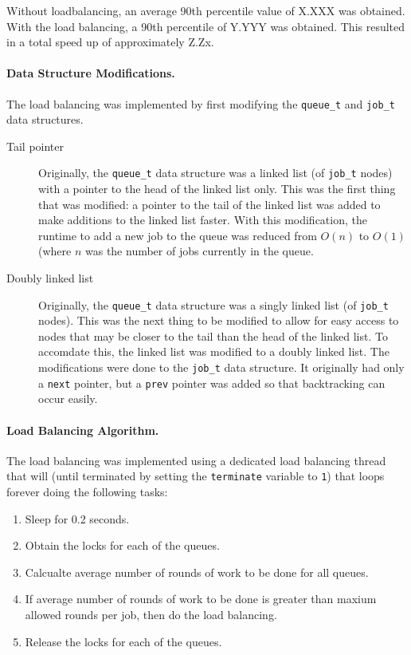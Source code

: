 \documentclass[12pt]{article}
\begin{document}
Without loadbalancing, an average 90th percentile value of X.XXX was obtained. With the load balancing, a 90th percentile of Y.YYY was obtained. This resulted in a total speed up of approximately Z.Zx.

\paragraph{Data Structure Modifications.} The load balancing was implemented by first modifying the {\tt queue_t} and {\tt job_t} data structures.
\begin{description}
  \item [Tail pointer] Originally, the {\tt queue_t} data structure was a linked list (of {\tt job_t} nodes) with a pointer to the head of the linked list only. This was the first thing that was modified: a pointer to the tail of the linked list was added to make additions to the linked list faster. With this modification, the runtime to add a new job to the queue was reduced from \( O(n) \) to \( O(1) \) (where \( n \) was the number of jobs currently in the queue.

  \item [Doubly linked list] Originally, the {\tt queue_t} data structure was a singly linked list (of {\tt job_t} nodes). This was the next thing to be modified to allow for easy access to nodes that may be closer to the tail than the head of the linked list. To accomdate this, the linked list was modified to a doubly linked list. The modifications were done to the {\tt job_t} data structure. It originally had only a {\tt next} pointer, but a {\tt prev} pointer was added so that backtracking can occur easily.
\end{description}

\paragraph{Load Balancing Algorithm.} The load balancing was implemented using a dedicated load balancing thread that will (until terminated by setting the {\tt terminate} variable to {\tt 1}) that loops forever doing the following tasks:
\begin{enumerate}
  \item Sleep for 0.2 seconds.
  \item Obtain the locks for each of the queues.
  \item Calcualte average number of rounds of work to be done for all queues.
  \item If average number of rounds of work to be done is greater than maxium allowed rounds per job, then do the load balancing.
  \item Release the locks for each of the queues.
\end{enumerate}
\end{document}
